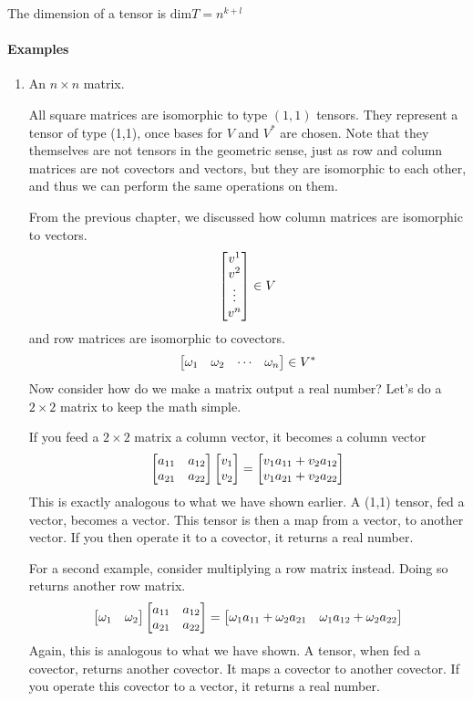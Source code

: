 		The dimension of a tensor is $\mathrm{dim} T = n^{k+l}$

		\paragraph{Examples}
		\begin{enumerate}[(1)]
			\item An $n\times n$ matrix.
				
				All square matrices are isomorphic to type $(1,1)$ tensors. They
				represent a tensor of type (1,1), once bases for $V$ and $V^*$ are chosen. Note 
				that they themselves are not tensors in the geometric sense, just as row and column matrices
				are not covectors and vectors, but they are isomorphic to each other, and
				thus we can perform the same operations on them.

				From the previous chapter, we discussed how column matrices 
				are isomorphic to vectors.
				\[
					\bmqty{
						v^1\\v^2\\\vdots\\v^n
					}\in V
				\]
				and row matrices are isomorphic to covectors.
				\[
					\bmqty{
						\omega_1 &
						\omega_2 &
						\cdots &
						\omega_n
					}
					\in V^*
				\]
				Now consider how do we make a matrix output a real number? Let's do a 
				$2\times 2$ matrix to keep the math simple.

				If you feed a $2\times 2$ matrix a column vector, it becomes a column
				vector
				\[
					\bmqty{
						a_{11} & a_{12}\\
						a_{21} & a_{22}\\
					} 
					\bmqty{
						v_1\\ v_2	
					} 
					=
					\bmqty{
						v_1 a_{11} + v_2 a_{12}\\
						v_1 a_{21} + v_2 a_{22}\\
					} 
				\]
				This is exactly analogous to what we have shown earlier. A (1,1) tensor,
				fed a vector, becomes a vector. This tensor is then a map from a vector, to
				another vector. If you then operate it to a covector, it returns a real number.

				For a second example, consider multiplying a row matrix instead. Doing 
				so returns another row matrix.
				\[
					\bmqty{
						\omega_1& \omega_2	
					} 
					\bmqty{
						a_{11} & a_{12}\\
						a_{21} & a_{22}\\
					} 
					=
					\bmqty{
						\omega_1 a_{11} +\omega_2 a_{21}&
						\omega_1 a_{12} +\omega_2 a_{22}
					} 
				\]
				Again, this is analogous to what we have shown. A tensor, when fed 
				a covector, returns another covector. It maps a covector to another 
				covector. If you operate this covector to a vector, it returns a real number. 


\end{enumerate}
